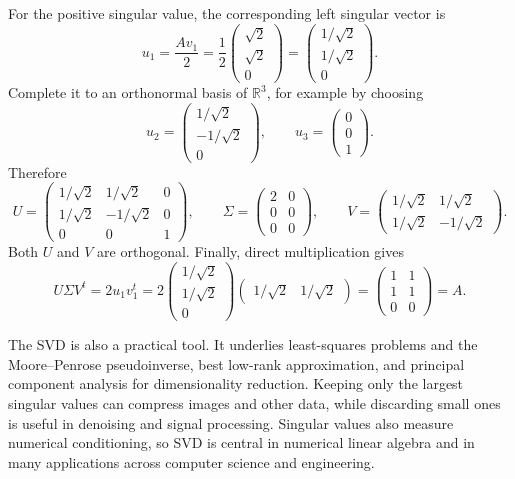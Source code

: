 \begin{example}
For the positive singular value, the corresponding left singular vector is
\[
u_1=\frac{Av_1}{2}
=\frac12\begin{pmatrix}\sqrt2\\\sqrt2\\0\end{pmatrix}
=\begin{pmatrix}1/\sqrt2\\1/\sqrt2\\0\end{pmatrix}.
\]
Complete it to an orthonormal basis of \(\mathbb R^3\), for example by
choosing
\[
u_2=\begin{pmatrix}1/\sqrt2\\-1/\sqrt2\\0\end{pmatrix},
\qquad
u_3=\begin{pmatrix}0\\0\\1\end{pmatrix}.
\]
Therefore
\[
U=\begin{pmatrix}
1/\sqrt2&1/\sqrt2&0\\
1/\sqrt2&-1/\sqrt2&0\\
0&0&1
\end{pmatrix},
\qquad
\Sigma=\begin{pmatrix}2&0\\0&0\\0&0\end{pmatrix},
\qquad
V=\begin{pmatrix}
1/\sqrt2&1/\sqrt2\\
1/\sqrt2&-1/\sqrt2
\end{pmatrix}.
\]
Both \(U\) and \(V\) are orthogonal.  Finally, direct multiplication gives
\[
U\Sigma V^t
=2u_1v_1^t
=2\begin{pmatrix}1/\sqrt2\\1/\sqrt2\\0\end{pmatrix}
\begin{pmatrix}1/\sqrt2&1/\sqrt2\end{pmatrix}
=\begin{pmatrix}1&1\\1&1\\0&0\end{pmatrix}=A.
\]
\end{example}

\begin{remark}
The SVD is also a practical tool.  It underlies least-squares problems and
the Moore--Penrose pseudoinverse, best low-rank approximation, and principal
component analysis for dimensionality reduction.  Keeping only the largest
singular values can compress images and other data, while discarding small
ones is useful in denoising and signal processing.  Singular values also
measure numerical conditioning, so SVD is central in numerical linear
algebra and in many applications across computer science and engineering.
\end{remark}

